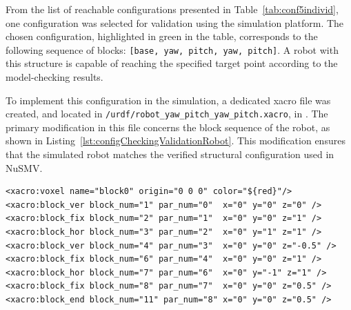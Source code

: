 

From the list of reachable configurations presented in Table~\ref{tab:conf5individ}, 
one configuration was selected for validation using the simulation platform. 
The chosen configuration, highlighted in green in the table, corresponds to 
the following sequence of blocks:
\texttt{[base, yaw, pitch, yaw, pitch]}. 
A robot with this structure is capable of reaching the specified target 
point according to the model-checking results.

To implement this configuration in the simulation, a dedicated 
xacro file was created, and located in 
\texttt{/urdf/robot\_yaw\_pitch\_yaw\_pitch.xacro}, in \cite{GitHub}. 
The primary modification in this file concerns the block sequence of the robot, 
as shown in Listing~\ref{lst:configCheckingValidationRobot}. 
This modification ensures that the simulated robot matches
the verified structural configuration used in NuSMV.

\begin{lstlisting}[language=NuSMV, caption={Structure of reachable configuration of a robot}, 
    label={lst:configCheckingValidationRobot}]
<xacro:voxel name="block0" origin="0 0 0" color="${red}"/>
<xacro:block_ver block_num="1" par_num="0"  x="0" y="0" z="0" />
<xacro:block_fix block_num="2" par_num="1"  x="0" y="0" z="1" />
<xacro:block_hor block_num="3" par_num="2"  x="0" y="1" z="1" />
<xacro:block_ver block_num="4" par_num="3"  x="0" y="0" z="-0.5" />
<xacro:block_fix block_num="6" par_num="4"  x="0" y="0" z="1" />
<xacro:block_hor block_num="7" par_num="6"  x="0" y="-1" z="1" />
<xacro:block_fix block_num="8" par_num="7"  x="0" y="0" z="0.5" />
<xacro:block_end block_num="11" par_num="8" x="0" y="0" z="0.5" />
\end{lstlisting}

